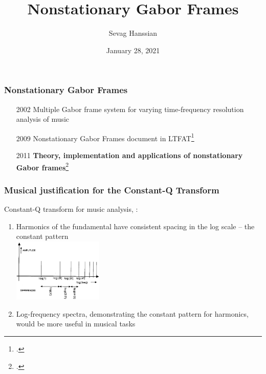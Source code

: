 \documentclass{beamer}
\title{Nonstationary Gabor Frames}
\author{Sevag Hanssian}
\date{January 28, 2021}
\institute{MUMT 622, Winter 2021}
\begin{document}
\begin{frame}
\maketitle
\end{frame}

\begin{frame}
	\frametitle{Nonstationary Gabor Frames}
	\begin{itemize}
		\item[2002] Multiple Gabor frame system for varying time-frequency resolution analysis of music
		\item[2009] Nonstationary Gabor Frames document in LTFAT\footcite{jaillet}
		\item[2011] \textbf{Theory, implementation and applications of nonstationary Gabor frames}\footcite{balazs}
	\end{itemize}
\end{frame}


\begin{frame}
	\frametitle{Musical justification for the Constant-Q Transform}
		Constant-Q transform for music analysis, :
		\begin{enumerate}
			\item
				Harmonics of the fundamental have consistent spacing in the log scale -- the constant pattern\\
				\includegraphics[height=3cm]{./logharmonic.png}
			\item
				Log-frequency spectra, demonstrating the constant pattern for harmonics, would be more useful in musical tasks
		\end{enumerate}
\end{frame}
\end{document}
